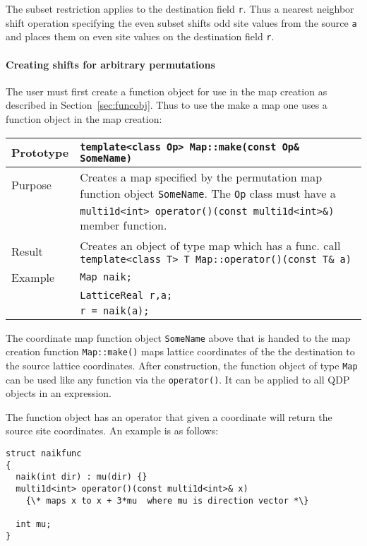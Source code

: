 \documentclass[12pt,letterpaper]{article}
\begin{document}
The subset restriction applies to the destination field {\tt r}.  Thus
a nearest neighbor shift operation specifying the even subset shifts
odd site values from the source {\tt a} and places them on even site
values on the destination field {\tt r}.

\paragraph{Creating shifts for arbitrary permutations}

The user must first create a function object for use in the
map creation as described in Section~\ref{sec:funcobj}. 
Thus to use the make a map one uses a function object in the map
creation:

\begin{flushleft}
\begin{tabular}{|l|p{5.0in}|}
\hline
Prototype  & \verb|template<class Op> Map::make(const Op& SomeName)|\\
\hline
Purpose      & Creates a map specified by the permutation map function 
               object {\tt SomeName}. The \verb|Op| class must have a \\
             & \verb|multi1d<int> operator()(const multi1d<int>&)| 
                   member function. \\
\hline
Result       & Creates an object of type map which has a func. call 
               \verb|template<class T> T Map::operator()(const T& a)| \\
\hline
Example      & \verb|Map naik;|\\
             & \verb|LatticeReal r,a;| \\
             & \verb|r = naik(a);| \\
\hline
  \end{tabular}
\end{flushleft}
%
The coordinate
map function object {\tt SomeName} above that is handed to the
map creation function \verb|Map::make()| maps lattice coordinates
of the the destination to the source lattice coordinates.
After construction, the function object of type \verb|Map| can be
used like any function via the \verb|operator()|. It can be applied
to all QDP objects in an expression.

The function object has an operator that given
a coordinate will return the source site coordinates. An example
is as follows:
\begin{verbatim}
struct naikfunc
{
  naik(int dir) : mu(dir) {}
  multi1d<int> operator()(const multi1d<int>& x)
    {\* maps x to x + 3*mu  where mu is direction vector *\}

  int mu;
}
\end{verbatim}
%
\end{document}

